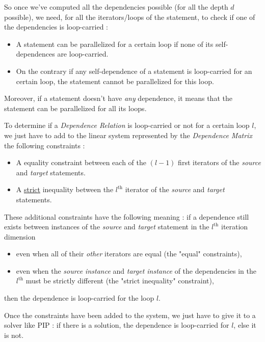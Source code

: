 \documentclass[paper=a4, fontsize=11.5pt]{scrartcl}
\numberwithin{equation}{section}        %
\numberwithin{figure}{section}          %
\numberwithin{table}{section}               %
\begin{document}
        So once we've computed all the dependencies possible (for all the depth $d$ possible),
        we need, for all the iterators/loops of the statement, to check if one of the dependencies
        is loop-carried :
        \begin{itemize}
            \item A statement can be parallelized for a certain loop if none of its \glspl{self-dependence}
                are loop-carried.
            \item On the contrary if any \gls{self-dependence} of a statement is loop-carried for an certain loop,
                the statement cannot be parallelized for this loop.
        \end{itemize}
        Moreover, if a statement doesn't have \textit{any} dependence, it means that the
        statement can be parallelized for all its loops.

        \bigskip

        To determine if a \textit{Dependence Relation} is loop-carried or not for a certain
        loop $l$, we just have to add to the linear system represented by the
        \textit{Dependence Matrix} the following constraints :
        \begin{itemize}
            \item A equality constraint between each of the $(l-1)$ first iterators
                of the \textit{source} and \textit{target} statements.
            \item A \underline{strict} inequality between the $l^{\text{th}}$ iterator of
                the \textit{source} and \textit{target} statements.
        \end{itemize}
        These additional constraints have the following meaning : if a dependence
        still exists between instances of the \textit{source} and \textit{target}
        statement in the $l^\text{th}$ iteration dimension
        \begin{itemize}
            \item even when all of their \textit{other} iterators are equal (the "equal" constraints),
            \item even when the \textit{source instance} and \textit{target instance} of the dependencies
                in the $l^\text{th}$ must be strictly different (the "strict inequality" constraint),
        \end{itemize}
        then the dependence is loop-carried for the loop $l$.

        Once the constraints have been added to the system, we just have to give it to a
        solver like PIP : if there is a solution, the dependence is loop-carried for $l$,
        else it is not.
        
\end{document}
